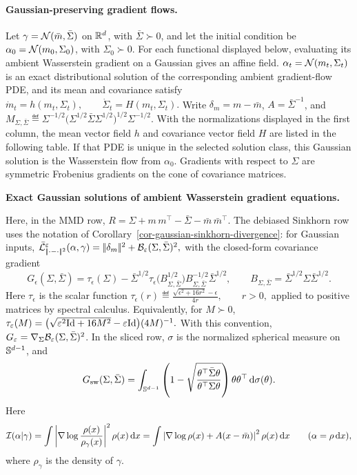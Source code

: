 \paragraph{Gaussian-preserving gradient flows.}
\begin{prop}\label{prop-centered-gaussian-covariance-catalogue}
Let \(\gamma=\mathcal{N}(\bar m,\bar\Sigma)\) on \(\mathbb{R}^d\), with \(\bar\Sigma\succ0\), and let the initial condition be \(\alpha_0=\mathcal{N}(m_0,\Sigma_0)\), with \(\Sigma_0\succ0\). For each functional displayed below, evaluating its ambient Wasserstein gradient on a Gaussian gives an affine field.
\(\alpha_t=\mathcal{N}(m_t,\Sigma_t)\)
is an exact distributional solution of the corresponding ambient gradient-flow PDE, and its mean and covariance satisfy
\(\dot{m}_t=h(m_t,\Sigma_t), \qquad \dot{\Sigma}_t=H(m_t,\Sigma_t).\)
Write \(\delta_m=m-\bar m\), \(A=\bar\Sigma^{-1}\), and
\(M_{\Sigma,\bar\Sigma} \eqdef \Sigma^{-1/2}\bigl(\Sigma^{1/2}\bar\Sigma\Sigma^{1/2}\bigr)^{1/2}\Sigma^{-1/2}.\)
With the normalizations displayed in the first column, the mean vector field \(h\) and covariance vector field \(H\) are listed in the following table. If that PDE is unique in the selected solution class, this Gaussian solution is the Wasserstein flow from \(\alpha_0\). Gradients with respect to \(\Sigma\) are symmetric Frobenius gradients on the cone of covariance matrices.
\begin{center}
\begingroup
\small
\renewcommand{\arraystretch}{1.55}
\textbf{Exact Gaussian solutions of ambient Wasserstein gradient equations.}\par\smallskip
\endgroup
\end{center}
Here, in the MMD row, \(R=\Sigma+m\,m^\top-\bar\Sigma-\bar m\,\bar m^\top.\)
The debiased Sinkhorn row uses the notation of Corollary~\ref{cor-gaussian-sinkhorn-divergence}: for Gaussian inputs,
\(\bar{\mathcal{L}}_{|\!| \cdot-\cdot |\!|^2}^{\varepsilon}(\alpha,\gamma) = |\!| \delta_m |\!|^2+\mathcal{B}_\varepsilon(\Sigma,\bar\Sigma)^2,\)
with the closed-form covariance gradient
\[
G_\epsilon(\Sigma,\bar\Sigma)
=
\tau_\epsilon(\Sigma)
-
\bar\Sigma^{1/2}
\tau_\epsilon\bigl(B_{\Sigma,\bar\Sigma}^{1/2}\bigr)
B_{\Sigma,\bar\Sigma}^{-1/2}
\bar\Sigma^{1/2},
\qquad
B_{\Sigma,\bar\Sigma}=\bar\Sigma^{1/2}\Sigma\bar\Sigma^{1/2}.
\]
Here \(\tau_\epsilon\) is the scalar function
\(\tau_\epsilon(r) \eqdef \frac{\sqrt{\epsilon^2+16r^2}-\epsilon}{4r}, \qquad r>0,\)
applied to positive matrices by spectral calculus. Equivalently, for \(M\succ0\), \(\tau_\varepsilon(M) = \bigl(\sqrt{\varepsilon^2 \mathrm{Id}+16M^2}-\varepsilon \mathrm{Id}\bigr)(4M)^{-1}.\)
With this convention, \(G_\varepsilon=\nabla_\Sigma \mathcal{B}_\varepsilon(\Sigma,\bar\Sigma)^2\).
In the sliced row, \(\sigma\) is the normalized spherical measure on \(\mathbb{S}^{d-1}\), and
\[
G_{\mathrm{sw}}(\Sigma,\bar\Sigma)
=
\int_{\mathbb{S}^{d-1}}
\left(
1-\sqrt{\frac{\theta^\top\bar\Sigma\theta}{\theta^\top\Sigma\theta}}
\right)
\theta\theta^\top\,\mathrm{d}\sigma(\theta).
\]
Here
\[
\mathcal I(\alpha|\gamma)
=
\int \left|\nabla\log\frac{\rho(x)}{\rho_\gamma(x)}\right|^2\rho(x)\,\mathrm{d} x
=
\int
\left|\nabla\log\rho(x)+A(x-\bar m)\right|^2\rho(x)\,\mathrm{d} x
\qquad(\alpha=\rho\,\mathrm{d} x),
\]
where $\rho_\gamma$ is the density of $\gamma$.
\end{prop}
